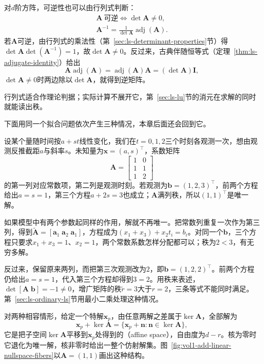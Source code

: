 \label{sec:ls-determinant-invertibility}%
对$d$阶方阵，可逆性也可以由行列式判断：
\begin{equation}
\begin{gathered}
\bm A\ \text{可逆}\iff\det\bm A\neq0,\\
\bm A^{-1}=\frac{1}{\det\bm A}\operatorname{adj}(\bm A).
\end{gathered}
\label{eq:ls-determinant-invertibility}
\end{equation}
若$\bm A$可逆，由行列式的乘法性（第~\ref{sec:ls-determinant-properties}节）得$\det\bm A\det(\bm A^{-1})=1$，故$\det\bm A\neq0$。反过来，古典伴随恒等式（定理~\ref{thm:ls-adjugate-identity}）给出
\[
 \bm A\operatorname{adj}(\bm A)=\operatorname{adj}(\bm A)\bm A=(\det\bm A)\bm I ,
\]
$\det\bm A\neq0$时两边除以$\det\bm A$，就得到逆矩阵。

行列式适合作理论判据；实际计算不展开它，第~\ref{sec:ls-lu}节的消元在求解的同时就能读出秩。

下面用同一个拟合问题依次产生三种情况，本章后面还会回到它。

\begin{example}[直线观测中的三种情况]
\label{ex:ls-line-three-cases}
设某个量随时间按$a+st$线性变化，我们在$t=0,1,2$三个时刻各观测一次，想由观测反推截距$a$与斜率$s$。未知量为$\bm x=(a,s)^\top$，系数矩阵
\[
 \bm A=\begin{bmatrix}1&0\\1&1\\1&2\end{bmatrix}
\]
的第一列对应常数项，第二列是观测时刻。若观测为$\bm b=(1,2,3)^\top$，前两个方程给出$a=s=1$，第三个方程$a+2s=3$也成立；$\bm A$满列秩，所以$(1,1)^\top$是唯一解。

如果模型中有两个参数起同样的作用，解就不再唯一。把常数列重复一次作为第三列，得到$\widetilde{\bm A}=[\bm a_1\;\bm a_2\;\bm a_1]$，方程成为$(x_1+x_3)+x_2t_i=b_i$。对同一个$\bm b$，三个方程只要求$x_1+x_3=1$、$x_2=1$，两个常数系数怎样分配都可以；秩为$2<3$，有无穷多解。

反过来，保留原来两列，而把第三次观测改为$2$，即$\bm b=(1,2,2)^\top$。前两个方程仍给出$a=s=1$，代入第三个方程却得到$3=2$。用秩来表述，$\det[\bm A\;\bm b]=-1\neq0$，增广矩阵的秩$\tilde r=3$大于$r=2$，三条等式不能同时满足。第~\ref{sec:ls-ordinary-ls}节用最小二乘处理这种情况。
\end{example}

对两种相容情形，给定一个特解$\bm x_p$，由任意两解之差属于$\ker\bm A$，全部解为
\begin{equation}
 \bm x_p+\ker\bm A=\{\bm x_p+\bm n:\bm n\in\ker\bm A\},
 \label{eq:ls-affine-solution-set}
\end{equation}
它是把子空间$\ker\bm A$平移到$\bm x_p$处得到的（affine space），自由度为$d-r$。核为零时它退化为唯一解，核非零时给出一整个仿射解集。图~\ref{fig:vol1-add-linear-nullspace-fibers}以$\bm A=(1,1)$画出这种结构。

